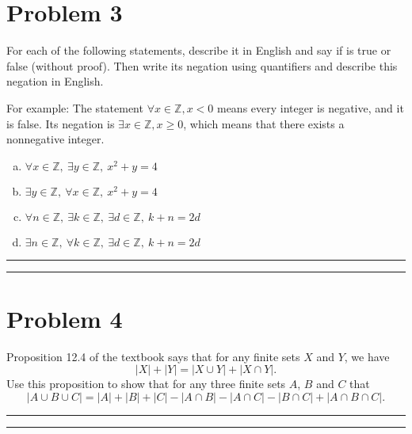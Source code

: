 \documentclass{article}
\theoremstyle{definition}
\newenvironment{solution}{\bigskip\hrule{\hfill}}{\bigskip\hrule{\hfill}} %
\begin{document}

\newpage


\section*{Problem 3}
For each of the following statements, describe it in English and say if is true or false (without proof). Then write its negation using quantifiers and describe this negation in English. \medskip

\noindent For example: The statement $\forall x\in\mathbb{Z},x<0$ means every integer is negative, and it is false. Its negation is $\exists x\in\mathbb{Z},x\geq 0$, which means that there exists a nonnegative integer.

\begin{enumerate}[a)] %
    \item $\forall x\in\mathbb{Z},~\exists y\in\mathbb{Z},~x^2+y=4$
    \item $\exists y\in\mathbb{Z},~\forall x\in\mathbb{Z},~x^2+y=4$
    \item $\forall n\in\mathbb{Z},~\exists k\in\mathbb{Z},~\exists d\in\mathbb{Z},~k+n=2d$
    \item $\exists n\in\mathbb{Z},~\forall k\in\mathbb{Z},~\exists d\in\mathbb{Z},~k+n=2d$
\end{enumerate}
\begin{solution}


\end{solution}


\newpage


\section*{Problem 4}
Proposition 12.4 of the textbook says that for any finite sets $X$ and $Y$, we have $$\left|X\right|+\left|Y\right|=\left|X\cup Y\right|+\left|X\cap Y\right|.$$ Use this proposition to show that for any three finite sets $A$, $B$ and $C$ that $$\left|A\cup B\cup C\right|=\left|A\right|+\left|B\right|+\left|C\right|-\left|A\cap B\right|-\left|A\cap C\right|-\left|B\cap C\right|+\left|A\cap B\cap C\right|.$$
\begin{solution}


\end{solution}
\end{document}
